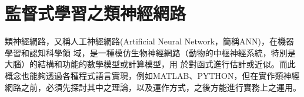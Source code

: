 %
%
\chapter{\MJH 監督式學習之類神經網路}
	類神經網路，又稱人工神經網路(Artificial Neural Network，簡稱ANN)，在機器學習和認知科學領			域，是一種模仿生物神經網路（動物的中樞神經系統，特別是大腦）的結構和功能的數學模型或計算模型，用		於對函式進行估計或近似。而此概念也能夠透過各種程式語言實現，例如MATLAB、PYTHON，但在實作類神經		網路之前，必須先探討其中之理論，以及運作方式，之後方能進行實務上之運用。
